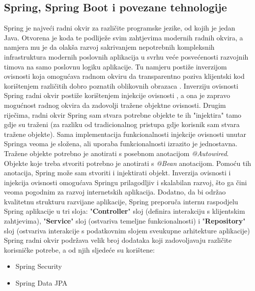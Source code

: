 \documentclass[times, utf8, zavrsni]{fer}
\begin{document}
			\subsection{Spring, Spring Boot i povezane tehnologije}
			Spring je najveći radni okvir za različite programske jezike, od kojih je jedan Java. Otvorena je koda te podliježe svim zahtjevima modernih radnih okvira, a namjera mu je da olakša razvoj sakrivanjem nepotrebnih kompleksnih infrastruktura modernih poslovnih aplikacija u svrhu veće posvećenosti razvojnih timova na samo poslovnu logiku aplikacije. Tu namjeru postiže inverzijom ovisnosti  koja omogućava radnom okviru da transparentno poziva klijentski kod korištenjem različitih dobro poznatih oblikovnih obrazaca . Inverziju ovisnosti Spring radni okvir postiže korištenjem injekcije ovisnosti , a ona je zapravo mogućnost radnog okvira da zadovolji tražene objektne ovisnosti. Drugim riječima, radni okvir Spring sam stvara potrebne objekte te ih "injektira" tamo gdje su traženi (za razliku od tradicionalnog pristupa gdje korisnik sam stvara tražene objekte). Sama implementacija funkcionalnosti injekcije ovisnosti unutar Springa veoma je složena, ali uporaba funkcionalnosti izrazito je jednostavna. Tražene objekte potrebno je anotirati s posebnom anotacijom \textit{@Autowired}. Objekte koje treba stvoriti potrebno je anotirati s \textit{@Bean} anotacijom. Pomoću tih anotacija, Spring može sam stvoriti i injektirati objekt. Inverzija ovisnosti i injekcija ovisnosti omogućava Springu prilagodljiv i skalabilan razvoj, što ga čini veoma pogodnim za razvoj internetskih aplikacija. Dodatno, da bi održao kvalitetnu strukturu razvijane aplikacije, Spring preporuča internu raspodjelu Spring aplikacije u tri sloja: "\textbf{Controller}" sloj (definira interakciju s klijentskim zahtjevima), "\textbf{Service}" sloj (ostvariva temeljne funkcionalnosti) i "\textbf{Repository}" sloj (ostvariva interakcije s podatkovnim slojem sveukupne arhitekture aplikacije)\\
			Spring radni okvir podržava velik broj dodataka koji zadovoljavaju različite korisničke potrebe, a od njih sljedeće su korištene:
			\begin{itemize}
				\item Spring Security
				\item Spring Data JPA
			\end{itemize}
\end{document}

